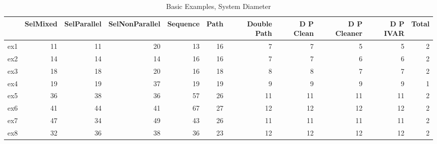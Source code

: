 \begin{table}
\centering
\caption{Basic Examples, System Diameter}
\label{b_e_diam}
\begin{tabular}{lrrrrrrrrrr}
\toprule
{} &  SelMixed &  SelParallel &  SelNonParallel &  Sequence &  Path &  Double Path &  D P Clean &  D P Cleaner &  D P IVAR &  Total \\
\midrule
ex1 &        11 &           11 &              20 &        13 &    16 &            7 &          7 &            5 &         5 &      2 \\
ex2 &        14 &           14 &              14 &        16 &    16 &            7 &          7 &            6 &         6 &      2 \\
ex3 &        18 &           18 &              20 &        16 &    18 &            8 &          8 &            7 &         7 &      2 \\
ex4 &        19 &           19 &              37 &        19 &    19 &            9 &          9 &            9 &         9 &      1 \\
ex5 &        36 &           38 &              36 &        57 &    26 &           11 &         11 &           11 &        11 &      2 \\
ex6 &        41 &           44 &              41 &        67 &    27 &           12 &         12 &           12 &        12 &      2 \\
ex7 &        47 &           34 &              49 &        43 &    26 &           11 &         11 &           11 &        11 &      2 \\
ex8 &        32 &           36 &              38 &        36 &    23 &           12 &         12 &           12 &        12 &      2 \\
\bottomrule
\end{tabular}
\end{table}
